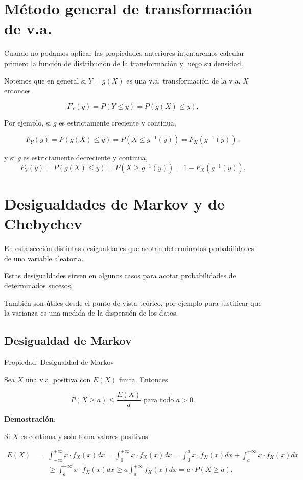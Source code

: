 \documentclass[
  letterpaper,
  DIV=11,
  numbers=noendperiod]{scrreprt}
\begin{document}
\section{Método general de transformación de
v.a.}\label{muxe9todo-general-de-transformaciuxf3n-de-v.a.}

Cuando no podamos aplicar las propiedades anteriores intentaremos
calcular primero la función de distribución de la transformación y luego
su densidad.

Notemos que en general si \(Y=g(X)\) es una v.a. transformación de la
v.a. \(X\) entonces

\[
F_{Y}(y)=P(Y\leq y)=P(g(X)\leq y).
\]

Por ejemplo, si \(g\) es estrictamente creciente y continua,

\[
F_{Y}(y)=P(g(X)\leq y)=P(X\leq g^{-1}(y))=F_{X}(g^{-1}(y)),
\]

y si \(g\) es estrictamente decreciente y continua, \[
F_{Y}(y)=P(g(X)\leq y)=P(X\geq g^{-1}(y))=1-F_{X}(g^{-1}(y)).
\]

\section{Desigualdades de Markov y de
Chebychev}\label{desigualdades-de-markov-y-de-chebychev}

En esta sección distintas desigualdades que acotan determinadas
probabilidades de una variable aleatoria.

Estas desigualdades sirven en algunos casos para acotar probabilidades
de determinados sucesos.

También son útiles desde el punto de vista teórico, por ejemplo para
justificar que la varianza es una medida de la dispersión de los datos.

\subsection{Desigualdad de Markov}\label{desigualdad-de-markov}

Propiedad: Desigualdad de Markov

Sea \(X\) una v.a. positiva con \(E(X)\) finita. Entonces

\[P(X\geq a)\leq \frac{E(X)}{a}\mbox{ para todo }a>0.\]

\textbf{Demostración}:

Si \(X\) es continua y solo toma valores positivos

\begin{eqnarray*}
E(X) &=& \int_{-\infty}^{+\infty} x\cdot f_{X}(x) dx=  \int_0^{+\infty} x\cdot f_{X}(x) dx=  \int_0^{a} x\cdot f_{X}(x) dx +\int_{a}^{+\infty} x\cdot f_{X}(x) dx \\
& &\geq   \int_{a}^{+\infty} x\cdot
f_{X}(x) dx \geq a \int_{a}^{+\infty}
f_{X}(x) dx = a \cdot  P(X\geq a),
\end{eqnarray*}
\end{document}

